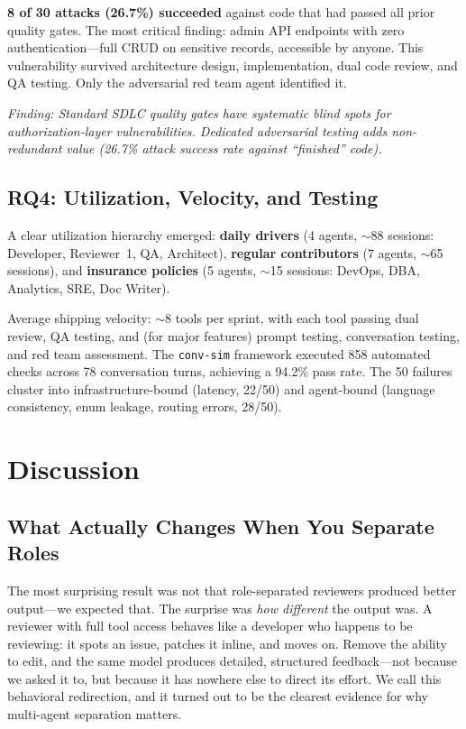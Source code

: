 \documentclass[a4paper,USenglish,cleveref,autoref]{lipics-v2021}
\begin{document}
\textbf{8 of 30 attacks (26.7\%) succeeded} against code that had passed all prior quality gates. The most critical finding: admin API endpoints with zero authentication---full CRUD on sensitive records, accessible by anyone. This vulnerability survived architecture design, implementation, dual code review, and QA testing. Only the adversarial red team agent identified it.

\emph{Finding: Standard SDLC quality gates have systematic blind spots for authorization-layer vulnerabilities. Dedicated adversarial testing adds non-redundant value (26.7\% attack success rate against ``finished'' code).}

\subsection{RQ4: Utilization, Velocity, and Testing}
\label{sec:rq4}

A clear utilization hierarchy emerged: \textbf{daily drivers} (4 agents, ${\sim}$88 sessions: Developer, Reviewer~1, QA, Architect), \textbf{regular contributors} (7 agents, ${\sim}$65 sessions), and \textbf{insurance policies} (5 agents, ${\sim}$15 sessions: DevOps, DBA, Analytics, SRE, Doc Writer).

Average shipping velocity: ${\sim}$8 tools per sprint, with each tool passing dual review, QA testing, and (for major features) prompt testing, conversation testing, and red team assessment. The \texttt{conv-sim} framework executed 858 automated checks across 78 conversation turns, achieving a 94.2\% pass rate. The 50 failures cluster into infrastructure-bound (latency, 22/50) and agent-bound (language consistency, enum leakage, routing errors, 28/50).

\section{Discussion}
\label{sec:discussion}

\subsection{What Actually Changes When You Separate Roles}

The most surprising result was not that role-separated reviewers produced better output---we expected that. The surprise was \emph{how different} the output was. A reviewer with full tool access behaves like a developer who happens to be reviewing: it spots an issue, patches it inline, and moves on. Remove the ability to edit, and the same model produces detailed, structured feedback---not because we asked it to, but because it has nowhere else to direct its effort. We call this behavioral redirection, and it turned out to be the clearest evidence for why multi-agent separation matters.
\end{document}
